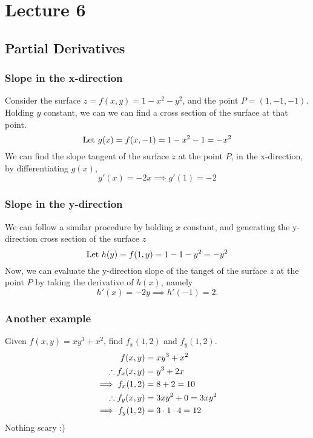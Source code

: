 \documentclass{report}
\begin{document}
\pagebreak
\section{Lecture 6}
\subsection*{Partial Derivatives}
\subsubsection*{Slope in the x-direction}
Consider the surface $z=f(x,y)=1-x^2-y^2$, and the point $P=(1,-1,-1)$. Holding $y$ constant, we can we can find a cross section of the surface at that point.
$$
	\text{Let } g(x) = f(x,-1)=1-x^2-1 = -x^2
$$
We can find the slope tangent of the surface $z$ at the point $P$, in the x-direction, by differentiating $g(x)$,
$$
	g'(x) = -2x \implies g'(1) = -2
$$

\subsubsection*{Slope in the y-direction}
We can follow a similar procedure by holding $x$ constant, and generating the y-direction cross section of the surface $z$
$$
	\text{Let } h(y) = f(1,y) = 1-1-y^2 = -y^2
$$
Now, we can evaluate the y-direction slope of the tanget of the surface $z$ at the point $P$ by taking the derivative of $h(x)$, namely
$$
	h'(x) = -2y \implies h'(-1) = 2.
$$

\subsubsection*{Another example}
Given $f(x,y)=xy^3 + x^2$, find $f_x(1,2)$ and $f_y(1,2)$.
\begin{gather*}
	\begin{aligned}
		f(x,y) &= xy^3 + x^2 \\
		\therefore f_x(x,y) &= y^3 + 2x \\
		\implies f_x(1,2) &= 8 + 2 = 10 \\
		\therefore f_y(x,y) &= 3xy^2 + 0 = 3xy^2 \\
		\implies f_y(1,2) &= 3\cdot1\cdot4 = 12 
	\end{aligned}
\end{gather*}
Nothing scary :)
\end{document}
